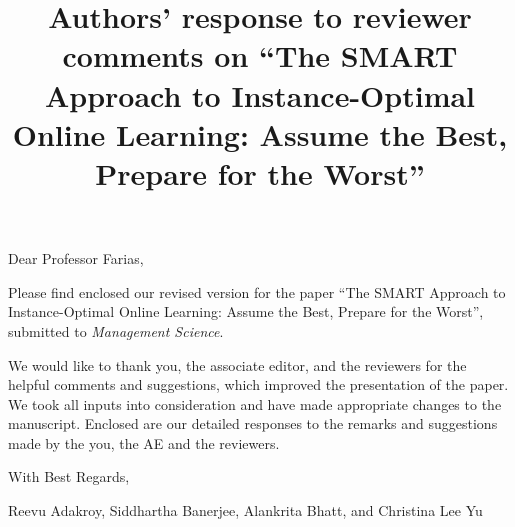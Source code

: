 \documentclass[11pt]{article}
\title{Authors' response to reviewer comments on ``The SMART Approach to Instance-Optimal Online Learning: Assume the Best, Prepare for the Worst''}
\date{}
\begin{document}
\maketitle

Dear Professor Farias, 

Please find enclosed our revised version for the paper ``The SMART Approach to Instance-Optimal Online Learning: Assume the Best, Prepare for the Worst'', submitted to \textit{Management Science}.

We would like to thank you, the associate editor, and the reviewers for the helpful comments and suggestions, which improved the presentation of the paper. We took all inputs into consideration and have made appropriate changes to the manuscript. 
Enclosed are our detailed responses to the remarks and suggestions made by the you, the AE and the reviewers.\newline

With Best Regards,

Reevu Adakroy, Siddhartha Banerjee, Alankrita Bhatt, and Christina Lee Yu


\newpage
\end{document}
